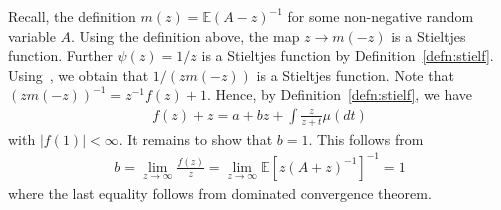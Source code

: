 \documentclass[10pt]{article}
\newcommand{\abs}[1]{| #1|}
\numberwithin{thm}{section}
\numberwithin{remark}{section}
\numberwithin{ex}{section}
\numberwithin{ass}{section}
\numberwithin{defn}{section}
\numberwithin{lemma}{section}
\numberwithin{corollary}{section}
\numberwithin{prop}{section}
\newcommand{\ee}{\mathbb{E}}
\numberwithin{equation}{section}
\begin{document}
Recall, the definition $m(z)= \mathbb{E}(A-z)^{-1}$ for some non-negative random variable $A$. Using the definition above, the map $z \to m(-z)$ is a Stieltjes function. Further $\psi(z)=1/z$ is a Stieltjes function by Definition~\ref{defn:stielf}. Using~\cite[Theorem 6.2(ii) and Corollary 7.9]{schilling2009bernstein}, we obtain that $1/(zm(-z))$ is a Stieltjes function. Note that $(zm(-z))^{-1} = z^{-1} f(z) + 1$. Hence, by Definition~\ref{defn:stielf}, we have
\begin{align*}
f(z)+z=a+bz + \int \frac{z}{z+t} \mu(dt)
\end{align*}
with $\abs{f(1)} <\infty$. It remains to show that $b=1$. This follows from
\begin{align*}
b=  \lim_{z\to \infty} \frac{f(z)}{z} = \lim_{z\to \infty} \ee[z (A+z)^{-1}]^{-1} = 1
\end{align*}
where the last equality follows from dominated convergence theorem.
\end{document}
